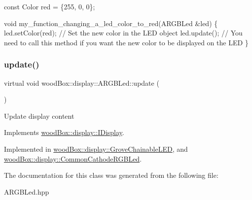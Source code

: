 \begin{DoxyCode}
\textcolor{keyword}{const} Color red = \{255, 0, 0\};

\textcolor{keywordtype}{void} my\_function\_changing\_a\_led\_color\_to\_red(ARGBLed &led) \{
  led.setColor(red); \textcolor{comment}{// Set the new color in the LED object}
  led.update(); \textcolor{comment}{// You need to call this method if you want the new color to be displayed on the LED}
\}
\end{DoxyCode}
 \mbox{\label{classwood_box_1_1display_1_1_a_r_g_b_led_ab71f321d91e931f95b96d1f492a9454d}} 
\subsubsection{\texorpdfstring{update()}{update()}}
{\footnotesize\ttfamily virtual void wood\+Box\+::display\+::\+A\+R\+G\+B\+Led\+::update (\begin{DoxyParamCaption}{ }\end{DoxyParamCaption})\hspace{0.3cm}{\ttfamily [pure virtual]}}

Update display content 

Implements \mbox{\hyperlink{classwood_box_1_1display_1_1_i_display_ad8c0811b8b807ce119a06c7806004de7}{wood\+Box\+::display\+::\+I\+Display}}.



Implemented in \mbox{\hyperlink{classwood_box_1_1display_1_1_grove_chainable_l_e_d_a650969665d0b5607465a63159c62e4ef}{wood\+Box\+::display\+::\+Grove\+Chainable\+L\+ED}}, and \mbox{\hyperlink{classwood_box_1_1display_1_1_common_cathode_r_g_b_led_a597c7ae002c7f94431ccaafd160a857a}{wood\+Box\+::display\+::\+Common\+Cathode\+R\+G\+B\+Led}}.



The documentation for this class was generated from the following file\+:\begin{DoxyCompactItemize}
\item 
A\+R\+G\+B\+Led.\+hpp\end{DoxyCompactItemize}
